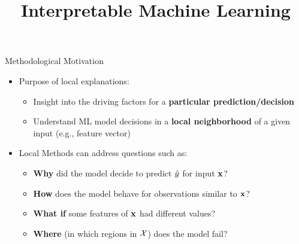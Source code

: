 \documentclass[10pt,compress,t,notes=noshow, xcolor=table]{beamer}
\title{Interpretable Machine Learning}
\date{}
\begin{document}






\begin{frame}[t]{Methodological Motivation}


	\begin{itemize}
	    \item Purpose of local explanations:
	    \begin{itemize}
	        \item Insight into the driving factors for a \textbf{particular prediction/decision}
	        \item Understand ML model decisions in a \textbf{local neighborhood} of a given input (e.g., feature vector)
	    \end{itemize}
	    \medskip
	    \pause
		\item Local Methods can address questions such as: 
		\begin{itemize}
		    \item \textbf{Why} did the model decide to predict $\hat{y}$ for input $\mathbf{x}$?
		    \item \textbf{How} does the model behave for observations similar to $\mathbf{x}$?
		    \item \textbf{What if} some features of $\mathbf{x}$ had different values?
		    \item  \textbf{Where} (in which regions in $\mathcal{X}$) does the model fail?
		\end{itemize}  
	\end{itemize}
\end{frame}
\end{document}

